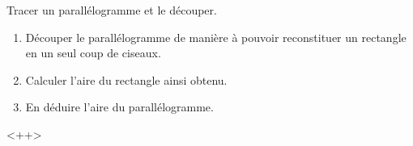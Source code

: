 
Tracer un parallélogramme et le découper.
\begin{enumerate}
    \item
Découper le parallélogramme de manière à pouvoir reconstituer un rectangle en un seul coup de ciseaux.
\item
 Calculer l'aire du rectangle ainsi obtenu.
\item
 En déduire l'aire du parallélogramme.
\end{enumerate}
<++>



